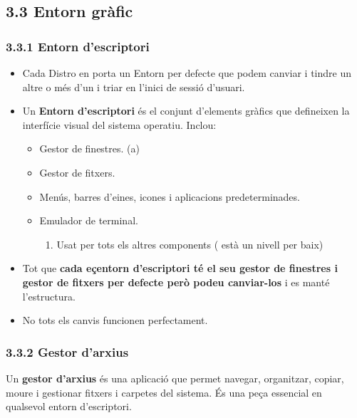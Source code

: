 \documentclass[
  a4paper,
]{article}
\providecommand{\tightlist}{%
  \setlength{\itemsep}{0pt}\setlength{\parskip}{0pt}}
\begin{document}
\subsection{3.3 Entorn gràfic}\label{entorn-gruxe0fic}

\subsubsection{3.3.1 Entorn d'escriptori}\label{entorn-descriptori}

\begin{itemize}
\item
  Cada Distro en porta un Entorn per defecte que podem canviar i tindre
  un altre o més d'un i triar en l'inici de sessió d'usuari.
\item
  Un \textbf{Entorn d'escriptori} és el conjunt d'elements gràfics que
  defineixen la interfície visual del sistema operatiu. Inclou:

  \begin{itemize}
  \item
    Gestor de finestres. (a)
  \item
    Gestor de fitxers.
  \item
    Menús, barres d'eines, icones i aplicacions predeterminades.
  \item
    Emulador de terminal.

    \begin{enumerate}
    \def\labelenumi{(\alph{enumi})}
    \tightlist
    \item
      Usat per tots els altres components ( està un nivell per baix)
    \end{enumerate}
  \end{itemize}
\item
  Tot que \textbf{cada eçentorn d'escriptori té el seu gestor de
  finestres i gestor de fitxers per defecte però podeu canviar-los} i es
  manté l'estructura.
\item
  No tots els canvis funcionen perfectament.
\end{itemize}

\subsubsection{3.3.2 Gestor d'arxius}\label{gestor-darxius}

Un \textbf{gestor d'arxius} és una aplicació que permet navegar,
organitzar, copiar, moure i gestionar fitxers i carpetes del sistema. És
una peça essencial en qualsevol entorn d'escriptori.
\end{document}
